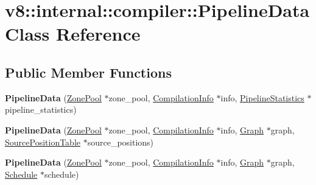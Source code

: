 \hypertarget{classv8_1_1internal_1_1compiler_1_1_pipeline_data}{}\section{v8\+:\+:internal\+:\+:compiler\+:\+:Pipeline\+Data Class Reference}
\label{classv8_1_1internal_1_1compiler_1_1_pipeline_data}
\subsection*{Public Member Functions}
\begin{DoxyCompactItemize}
\item 
{\bfseries Pipeline\+Data} (\hyperlink{classv8_1_1internal_1_1compiler_1_1_zone_pool}{Zone\+Pool} $\ast$zone\+\_\+pool, \hyperlink{classv8_1_1internal_1_1_compilation_info}{Compilation\+Info} $\ast$info, \hyperlink{classv8_1_1internal_1_1compiler_1_1_pipeline_statistics}{Pipeline\+Statistics} $\ast$pipeline\+\_\+statistics)\hypertarget{classv8_1_1internal_1_1compiler_1_1_pipeline_data_a0953ecd659f1a8c387f3b9d5aaf11897}{}\label{classv8_1_1internal_1_1compiler_1_1_pipeline_data_a0953ecd659f1a8c387f3b9d5aaf11897}

\item 
{\bfseries Pipeline\+Data} (\hyperlink{classv8_1_1internal_1_1compiler_1_1_zone_pool}{Zone\+Pool} $\ast$zone\+\_\+pool, \hyperlink{classv8_1_1internal_1_1_compilation_info}{Compilation\+Info} $\ast$info, \hyperlink{classv8_1_1internal_1_1compiler_1_1_graph}{Graph} $\ast$graph, \hyperlink{classv8_1_1internal_1_1compiler_1_1_source_position_table}{Source\+Position\+Table} $\ast$source\+\_\+positions)\hypertarget{classv8_1_1internal_1_1compiler_1_1_pipeline_data_a4add1cb0b2234208991137dcd5dcad34}{}\label{classv8_1_1internal_1_1compiler_1_1_pipeline_data_a4add1cb0b2234208991137dcd5dcad34}

\item 
{\bfseries Pipeline\+Data} (\hyperlink{classv8_1_1internal_1_1compiler_1_1_zone_pool}{Zone\+Pool} $\ast$zone\+\_\+pool, \hyperlink{classv8_1_1internal_1_1_compilation_info}{Compilation\+Info} $\ast$info, \hyperlink{classv8_1_1internal_1_1compiler_1_1_graph}{Graph} $\ast$graph, \hyperlink{classv8_1_1internal_1_1compiler_1_1_schedule}{Schedule} $\ast$schedule)\hypertarget{classv8_1_1internal_1_1compiler_1_1_pipeline_data_a8ea53d3641cef364c5d71df6a7dd8ec9}{}\label{classv8_1_1internal_1_1compiler_1_1_pipeline_data_a8ea53d3641cef364c5d71df6a7dd8ec9}


\end{DoxyCompactItemize}
